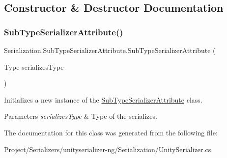 \subsection{Constructor \& Destructor Documentation}
\mbox{\label{class_serialization_1_1_sub_type_serializer_attribute_aa77d94a73aa56a1e382ec6801fb883e5}} 
\subsubsection{\texorpdfstring{Sub\+Type\+Serializer\+Attribute()}{SubTypeSerializerAttribute()}}
{\footnotesize\ttfamily Serialization.\+Sub\+Type\+Serializer\+Attribute.\+Sub\+Type\+Serializer\+Attribute (\begin{DoxyParamCaption}\item[{Type}]{serializes\+Type }\end{DoxyParamCaption})\hspace{0.3cm}{\ttfamily [inline]}}



Initializes a new instance of the \hyperlink{class_serialization_1_1_sub_type_serializer_attribute}{Sub\+Type\+Serializer\+Attribute} class. 


\begin{DoxyParams}{Parameters}
{\em serializes\+Type} & Type of the serializes.\\
\hline
\end{DoxyParams}


The documentation for this class was generated from the following file\+:\begin{DoxyCompactItemize}
\item 
Project/\+Serializers/unityserializer-\/ng/\+Serialization/Unity\+Serializer.\+cs\end{DoxyCompactItemize}
